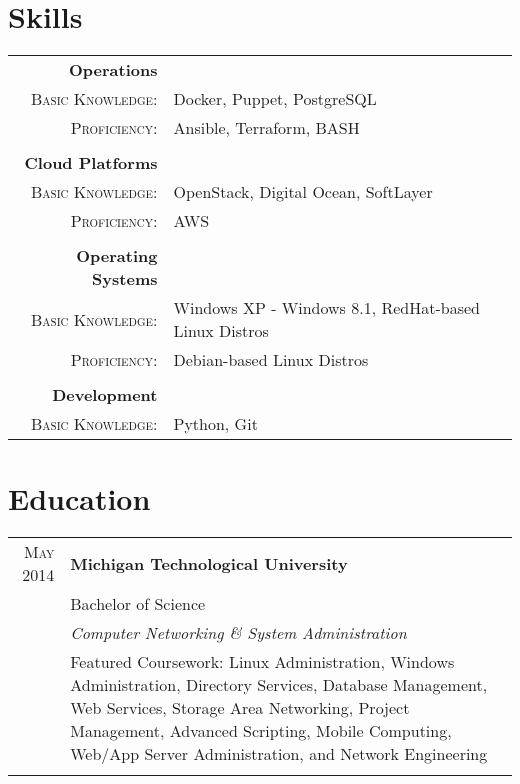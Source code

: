 \documentclass[a4paper,9pt]{extarticle}
\begin{document}
\section{Skills}
\begin{tabular}{rl}
 \textbf{Operations}&\\\textsc{Basic Knowledge:}&\footnotesize{Docker, Puppet, PostgreSQL}\\\textsc{Proficiency:}&\footnotesize{Ansible, Terraform, BASH}\\\multicolumn{2}{c}{}\\
 \textbf{Cloud Platforms}&\\\textsc{Basic Knowledge:}&\footnotesize{OpenStack, Digital Ocean, SoftLayer}\\\textsc{Proficiency:}&\footnotesize{AWS}\\\multicolumn{2}{c}{}\\
 \textbf{Operating Systems}&\\\textsc{Basic Knowledge:}&\footnotesize{Windows XP - Windows 8.1, RedHat-based Linux Distros}\\\textsc{Proficiency:}&\footnotesize{Debian-based Linux Distros}\\\multicolumn{2}{c}{}\\
 \textbf{Development}&\\\textsc{Basic Knowledge:}&\footnotesize{Python, Git}
\end{tabular}

\section{Education}
\begin{tabular}{rp{8.5cm}}
 \textsc{May 2014}&\textbf{Michigan Technological University}\\&Bachelor of Science\\&\emph{Computer Networking \& System Administration}\\&\footnotesize{Featured Coursework: Linux Administration, Windows Administration, Directory Services, Database Management, Web Services, Storage Area Networking, Project Management, Advanced Scripting, Mobile Computing, Web/App Server Administration, and Network Engineering}\\\multicolumn{2}{c}{}\\
\end{tabular}
\end{document}
